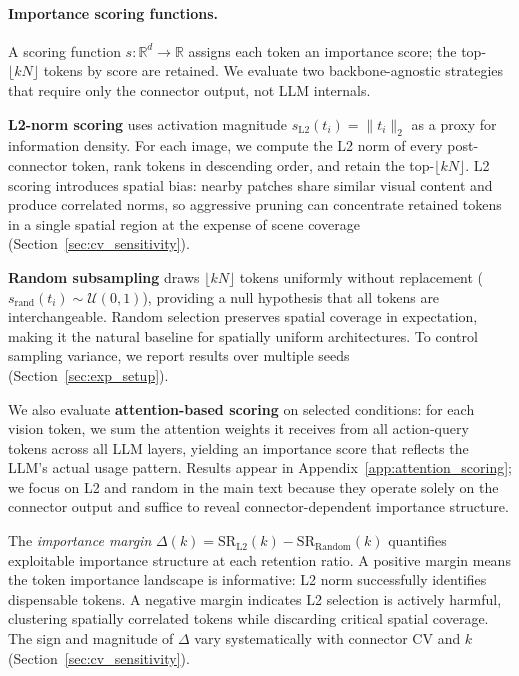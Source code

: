 \paragraph{Importance scoring functions.}
A scoring function $s\colon \mathbb{R}^d \to \mathbb{R}$ assigns each token an importance score; the top-$\lfloor kN \rfloor$ tokens by score are retained. We evaluate two backbone-agnostic strategies that require only the connector output, not LLM internals.

\textbf{L2-norm scoring} uses activation magnitude $s_{\text{L2}}(t_i) = \|t_i\|_2$ as a proxy for information density. For each image, we compute the L2 norm of every post-connector token, rank tokens in descending order, and retain the top-$\lfloor kN \rfloor$. L2 scoring introduces spatial bias: nearby patches share similar visual content and produce correlated norms, so aggressive pruning can concentrate retained tokens in a single spatial region at the expense of scene coverage (Section~\ref{sec:cv_sensitivity}).

\textbf{Random subsampling} draws $\lfloor kN \rfloor$ tokens uniformly without replacement ($s_{\text{rand}}(t_i) \sim \mathcal{U}(0, 1)$), providing a null hypothesis that all tokens are interchangeable. Random selection preserves spatial coverage in expectation, making it the natural baseline for spatially uniform architectures. To control sampling variance, we report results over multiple seeds (Section~\ref{sec:exp_setup}).

We also evaluate \textbf{attention-based scoring} on selected conditions: for each vision token, we sum the attention weights it receives from all action-query tokens across all LLM layers, yielding an importance score that reflects the LLM's actual usage pattern. Results appear in Appendix~\ref{app:attention_scoring}; we focus on L2 and random in the main text because they operate solely on the connector output and suffice to reveal connector-dependent importance structure.

The \emph{importance margin} $\Delta(k) = \text{SR}_{\text{L2}}(k) - \text{SR}_{\text{Random}}(k)$ quantifies exploitable importance structure at each retention ratio. A positive margin means the token importance landscape is informative: L2 norm successfully identifies dispensable tokens. A negative margin indicates L2 selection is actively harmful, clustering spatially correlated tokens while discarding critical spatial coverage. The sign and magnitude of $\Delta$ vary systematically with connector CV and $k$ (Section~\ref{sec:cv_sensitivity}).

